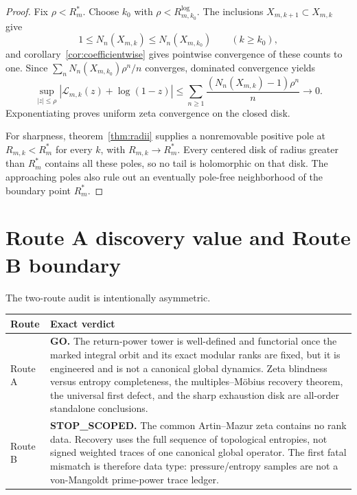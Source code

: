 \documentclass[11pt]{article}
\numberwithin{equation}{section}
\theoremstyle{remark}
\newcommand{\cL}{\mathcal L}
\begin{document}
\begin{proof}
Fix $\rho<R_m^*$.  Choose $k_0$ with
\(
\rho<R_{m,k_0}^{\log}
\).
The inclusions $X_{m,k+1}\subset X_{m,k}$ give
\[
 1\le N_n(X_{m,k})\le N_n(X_{m,k_0})
 \qquad(k\ge k_0),
\]
and corollary~\ref{cor:coefficientwise} gives pointwise convergence of these
counts to one.  Since
\(
\sum_n N_n(X_{m,k_0})\rho^n/n
\)
converges, dominated convergence yields
\[
 \sup_{|z|\le\rho}
 \left|\cL_{m,k}(z)+\log(1-z)\right|
 \le\sum_{n\ge1}\frac{(N_n(X_{m,k})-1)\rho^n}{n}
 \longrightarrow0.
\]
Exponentiating proves uniform zeta convergence on the closed disk.

For sharpness, theorem~\ref{thm:radii} supplies a nonremovable positive pole
at $R_{m,k}<R_m^*$ for every $k$, with $R_{m,k}\to R_m^*$.  Every
centered disk of radius greater than $R_m^*$ contains all these poles, so
no tail is holomorphic on that disk.  The approaching poles also rule out an
eventually pole-free neighborhood of the boundary point $R_m^*$.
\end{proof}

\section{Route A discovery value and Route B boundary}

The two-route audit is intentionally asymmetric.

\begin{center}
\begin{tabular}{p{}p{}}
\toprule
Route & Exact verdict \\
\midrule
Route A & \textbf{GO.}  The return-power tower is well-defined and functorial
once the marked integral orbit and its exact modular ranks are fixed, but it
is engineered and is not a canonical global dynamics.  Zeta blindness versus
entropy completeness, the multiples--M\"obius recovery theorem, the
universal first defect, and the sharp exhaustion disk are all-order
standalone conclusions. \\
Route B & \textbf{STOP\_SCOPED.}  The common Artin--Mazur zeta contains no
rank data.  Recovery uses the full sequence of topological entropies, not
signed weighted traces of one canonical global operator.  The first fatal
mismatch is therefore data type: pressure/entropy samples are not a
von-Mangoldt prime-power trace ledger. \\
\bottomrule
\end{tabular}
\end{center}
\end{document}
